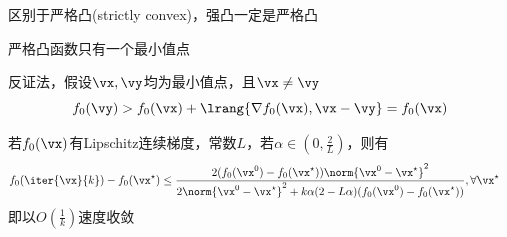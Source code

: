 区别于严格凸(strictly convex)，强凸一定是严格凸

\begin{theorem}
    严格凸函数只有一个最小值点
\end{theorem}
\begin{analysis}
    反证法，假设$\vx,\vy$均为最小值点，且$\vx\ne \vy$
    \[f_0(\vy)>f_0(\vx)+\lrang{\nabla f_0(\vx),\vx-\vy}=f_0(\vx)\]
\end{analysis}

\begin{theorem}
    若$f_0(\vx)$有Lipschitz连续梯度，常数$L$，若$\alpha\in(0,\frac{2}{L})$，则有
    \[\begin{aligned}
        f_0(\iter{\vx}{k})-f_0(\vx^\star)&\leq \frac{2(f_0(\vx^0)-f_0(\vx^\star))\norm{\vx^0-\vx^\star}^2}
        {2\norm{\vx^0-\vx^\star}^2+k\alpha(2-L\alpha)(f_0(\vx^0)-f_0(\vx^\star))},\forall \vx^\star
    \end{aligned}\]
    即以$O(\frac{1}{k})$速度收敛
\end{theorem}
